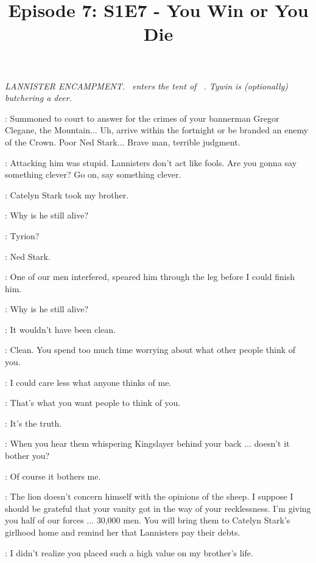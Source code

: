 

\title{Episode 7: S1E7 - You Win or You Die}
\author{}
\date{}
\maketitle




\scene

\textit{ LANNISTER ENCAMPMENT.}
\textit{ \JAIME ~enters the tent of \TYWIN ~. Tywin is (optionally) butchering a deer.} 

\JAIME:  Summoned to court to answer for the crimes of your bannerman Gregor Clegane, the Mountain$\ldots$  Uh, arrive within the fortnight or be branded an enemy of the Crown.  Poor Ned Stark$\ldots$ Brave man, terrible judgment. 

\TYWIN: Attacking him was stupid.  Lannisters don't act like fools. Are you gonna say something clever? Go on, say something clever. 

\JAIME: Catelyn Stark took my brother. 

\TYWIN: Why is he still alive? 

\JAIME: Tyrion? 

\TYWIN: Ned Stark. 

\JAIME: One of our men interfered, speared him through the leg before I could finish him. 

\TYWIN: Why is he still alive? 

\JAIME: It wouldn't have been clean. 

\TYWIN: Clean. You spend too much time worrying about what other people think of you. 

\JAIME: I could care less what anyone thinks of me. 

\TYWIN: That's what you want people to think of you. 

\JAIME: It's the truth. 

\TYWIN: When you hear them whispering Kingslayer behind your back $\ldots$ doesn't it bother you? 

\JAIME: Of course it bothers me. 

\TYWIN: The lion doesn't concern himself with the opinions of the sheep.  I suppose I should be grateful that your vanity got in the way of your recklessness.  I'm giving you half of our forces $\ldots$ 30,000 men. You will bring them to Catelyn Stark's girlhood home and remind her that Lannisters pay their debts. 

\JAIME: I didn't realize you placed such a high value on my brother's life. 


